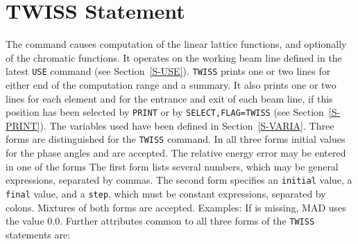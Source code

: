 \section{TWISS Statement}
\label{S-TWISS}
The  command causes computation of the linear lattice
functions,
and optionally of the chromatic functions.
It operates on the working beam line defined in the latest
{\tt USE} command (see Section~\ref{S-USE}).
{\tt TWISS} prints one or two lines for either end
of the computation range and a summary.
It also prints one or two lines for each element and
for the entrance and exit of each beam line,
if this position has been selected by {\tt PRINT} or
by {\tt SELECT,FLAG=TWISS} (see Section~\ref{S-PRINT}).
The variables used have been defined in Section~\ref{S-VARIA}.
Three forms are distinguished for the {\tt TWISS} command.
In all three forms initial values for
the phase angles  and  are accepted.
The relative energy error  may be entered in one of the forms
The first form lists several numbers, which may be general expressions,
separated by commas.
The second form specifies an {\tt initial} value, a {\tt final} value,
and a {\tt step}, which must be constant expressions,
separated by colons.
Mixtures of both forms are accepted.
Examples:
If  is missing, MAD uses the value 0.0.
Further attributes common to all three forms
of the {\tt TWISS} statements are:
